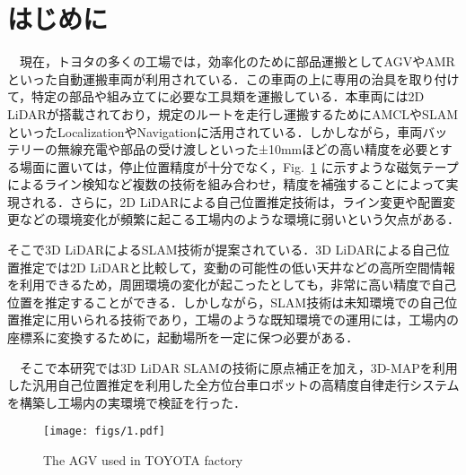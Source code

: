 \section{はじめに}
　現在，トヨタの多くの工場では，効率化のために部品運搬としてAGVやAMRといった自動運搬車両が利用されている．この車両の上に専用の治具を取り付けて，特定の部品や組み立てに必要な工具類を運搬している．本車両には2D LiDARが搭載されており，規定のルートを走行し運搬するためにAMCLやSLAM\cite{2d-AMCL, 2d-SLAM}といったLocalizationやNavigationに活用されている．しかしながら，車両バッテリーの無線充電や部品の受け渡しといった±10mmほどの高い精度を必要とする場面に置いては，停止位置精度が十分でなく，Fig.~\ref{fig:fig1} に示すような磁気テープによるライン検知など複数の技術を組み合わせ，精度を補強することによって実現される．さらに，2D LiDARによる自己位置推定技術は，ライン変更や配置変更などの環境変化が頻繁に起こる工場内のような環境に弱いという欠点がある．

そこで3D LiDARによるSLAM技術が提案されている\cite{FAST-LIO}．3D LiDARによる自己位置推定では2D LiDARと比較して，変動の可能性の低い天井などの高所空間情報を利用できるため，周囲環境の変化が起こったとしても，非常に高い精度で自己位置を推定することができる．しかしながら，SLAM技術は未知環境での自己位置推定に用いられる技術であり，工場のような既知環境での運用には，工場内の座標系に変換するために，起動場所を一定に保つ必要がある．

　そこで本研究では3D LiDAR SLAMの技術に原点補正を加え，3D-MAPを利用した汎用自己位置推定を利用した全方位台車ロボットの高精度自律走行システムを構築し工場内の実環境で検証を行った．
\begin{figure}[htbp]
\begin{flushleft}
\texttt{[image: figs/1.pdf]}
\caption{The AGV used in TOYOTA factory}
\label{fig:fig1}
\end{flushleft}
\end{figure}
